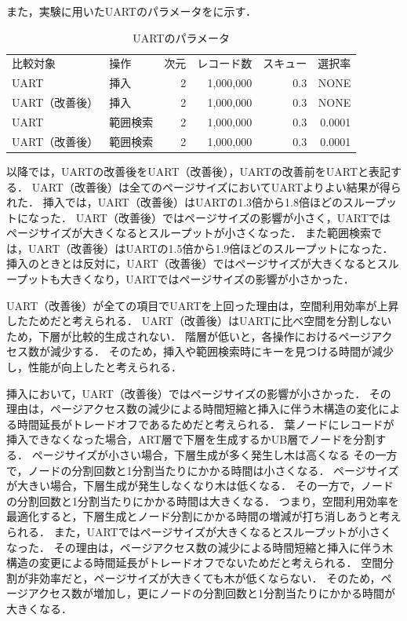 また，実験に用いたUARTのパラメータを\Tab{\ref{tab:pagesize}}に示す．
\begin{table}[tb]
  \caption{UARTのパラメータ}
  \label{tab:pagesize}
  \centering \small
  \begin{tabular}{llrrrr}
    \toprule
    比較対象       & 操作     & 次元 & レコード数 & スキュー & 選択率 \\
    \cmidrule(lr){1-1}
    \cmidrule(lr){2-2}
    \cmidrule(lr){3-3}
    \cmidrule(lr){4-4}
    \cmidrule(lr){5-5}
    \cmidrule(lr){6-6}
    UART           & 挿入     & 2    & 1,000,000  & 0.3      & NONE   \\
    UART（改善後） & 挿入     & 2    & 1,000,000  & 0.3      & NONE   \\
    UART           & 範囲検索 & 2    & 1,000,000  & 0.3      & 0.0001 \\
    UART（改善後） & 範囲検索 & 2    & 1,000,000  & 0.3      & 0.0001 \\
    \bottomrule
  \end{tabular}
\end{table}
以降では，UARTの改善後をUART（改善後），UARTの改善前をUARTと表記する．
UART（改善後）は全てのページサイズにおいてUARTよりよい結果が得られた．
挿入では，UART（改善後）はUARTの1.3倍から1.8倍ほどのスループットになった．
UART（改善後）ではページサイズの影響が小さく，UARTではページサイズが大きくなるとスループットが小さくなった．
また範囲検索では，UART（改善後）はUARTの1.5倍から1.9倍ほどのスループットになった．
挿入のときとは反対に，UART（改善後）ではページサイズが大きくなるとスループットも大きくなり，UARTではページサイズの影響が小さかった．

UART（改善後）が全ての項目でUARTを上回った理由は，空間利用効率が上昇したためだと考えられる．
UART（改善後）はUARTに比べ空間を分割しないため，下層が比較的生成されない．
階層が低いと，各操作におけるページアクセス数が減少する．
そのため，挿入や範囲検索時にキーを見つける時間が減少し，性能が向上したと考えられる．

挿入において，UART（改善後）ではページサイズの影響が小さかった．
その理由は，ページアクセス数の減少による時間短縮と挿入に伴う木構造の変化による時間延長がトレードオフであるためだと考えられる．
葉ノードにレコードが挿入できなくなった場合，ART層で下層を生成するかUB層でノードを分割する．
ページサイズが小さい場合，下層生成が多く発生し木は高くなる
その一方で，ノードの分割回数と1分割当たりにかかる時間は小さくなる．
ページサイズが大きい場合，下層生成が発生しなくなり木は低くなる．
その一方で，ノードの分割回数と1分割当たりにかかる時間は大きくなる．
つまり，空間利用効率を最適化すると，下層生成とノード分割にかかる時間の増減が打ち消しあうと考えられる．
また，UARTではページサイズが大きくなるとスループットが小さくなった．
その理由は，ページアクセス数の減少による時間短縮と挿入に伴う木構造の変更による時間延長がトレードオフでないためだと考えられる．
空間分割が非効率だと，ページサイズが大きくても木が低くならない．
そのため，ページアクセス数が増加し，更にノードの分割回数と1分割当たりにかかる時間が大きくなる．

